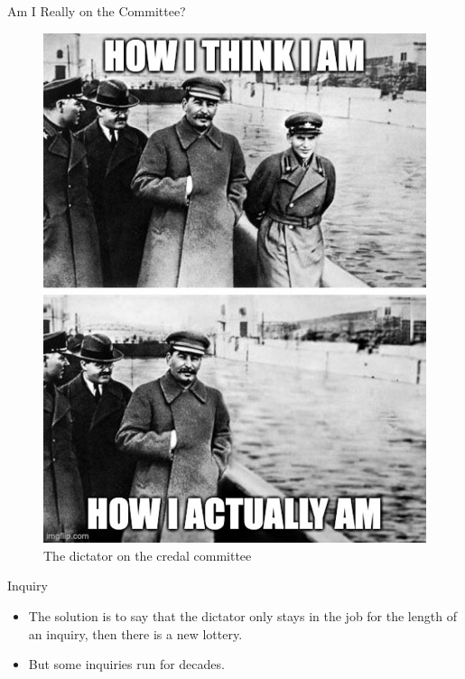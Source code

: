 \documentclass[
  ignorenonframetext,
]{beamer}
\providecommand{\tightlist}{%
  \setlength{\itemsep}{0pt}\setlength{\parskip}{0pt}}
\begin{document}
\begin{frame}{Am I Really on the Committee?}
\protect\hypertarget{am-i-really-on-the-committee}{}
~

\begin{figure}
\centering
\includegraphics[width=\textwidth,height=0.7\textheight]{missing.jpg}
\caption{The dictator on the credal committee}
\end{figure}
\end{frame}

\begin{frame}{Inquiry}
\protect\hypertarget{inquiry}{}
\begin{itemize}[<+->]
\tightlist
\item
  The solution is to say that the dictator only stays in the job for the
  length of an inquiry, then there is a new lottery.
\item
  But some inquiries run for decades.
\end{itemize}
\end{frame}
\end{document}
